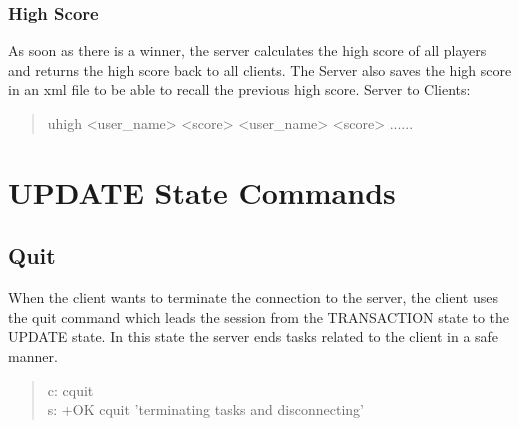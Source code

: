 \documentclass[a4paper,11pt]{article}
\begin{document}
\subsubsection{High Score}
As soon as there is a winner, the server calculates the high score of all players and returns the high score back to all clients. The Server also saves the high score in an xml file to be able to recall the previous high score.
Server to Clients:
\begin{quote}
  uhigh <user\_name> <score> <user\_name> <score> ......
\end{quote} 


\clearpage
\section{UPDATE State Commands}
\subsection{Quit}
When the client wants to terminate the connection to the server, the client uses the quit command which leads the session from the TRANSACTION state to the UPDATE state. In this state the server ends tasks related to the client in a safe manner.

\begin{quote}
  c: cquit\\
  s: +OK cquit 'terminating tasks and disconnecting'
\end{quote}
\end{document}
